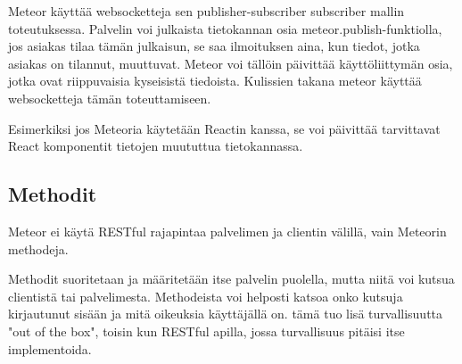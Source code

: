 Meteor käyttää websocketteja sen publisher-subscriber subscriber mallin toteutuksessa.
%
Palvelin voi julkaista tietokannan osia meteor.publish-funktiolla, jos asiakas tilaa tämän julkaisun, se saa ilmoituksen aina, kun tiedot, jotka asiakas on tilannut, muuttuvat.
Meteor voi tällöin päivittää käyttöliittymän osia, jotka ovat riippuvaisia kyseisistä tiedoista. 
%
%
Kulissien takana meteor käyttää websocketteja tämän toteuttamiseen. 
\medskip


Esimerkiksi jos Meteoria käytetään Reactin kanssa, se voi päivittää tarvittavat React komponentit tietojen muututtua tietokannassa.



\medskip



\subsection*{Methodit}

Meteor ei käytä RESTful rajapintaa palvelimen ja clientin välillä, vain Meteorin methodeja.

Methodit suoritetaan ja määritetään itse palvelin puolella, mutta niitä voi kutsua clientistä tai palvelimesta.
%
Methodeista voi helposti katsoa onko kutsuja kirjautunut sisään ja mitä oikeuksia käyttäjällä on. tämä tuo lisä turvallisuutta "out of the box", toisin kun RESTful apilla, jossa turvallisuus pitäisi itse implementoida.
\medskip

